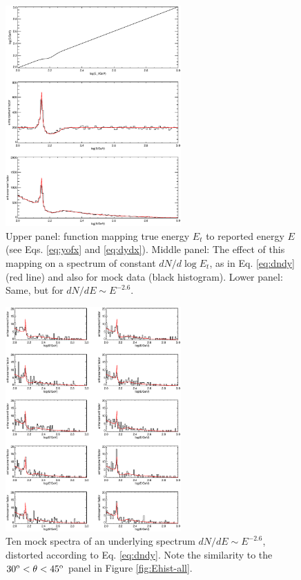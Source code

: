\documentclass[aps,twocolumn,prd,superscriptaddress,showpacs,nofootinbib,fixfloat]{revtex4}
\newcommand{\degree}{^{\rm o}}
\begin{document}
\begin{figure}[p]
\centering
\includegraphics[width=0.6\textwidth]{plots/limb_bump_model.ps}
\caption{Upper panel: function mapping true energy $E_t$ to reported energy
  $E$ (see Eqs. \ref{eq:yofx} and \ref{eq:dydx}).  Middle panel: The effect of
  this mapping on a spectrum of constant $dN/d\log E_t$, as in Eq.
  \ref{eq:dndy} (red line) and also for mock data (black histogram).  Lower
  panel: Same, but for $dN/dE \sim E^{-2.6}$.  }
\label{fig:bumpmodel}
\end{figure}

\begin{figure}[p]
\centering
\includegraphics[width=0.6\textwidth]{plots/limb_bump_model_many.ps}
\caption{Ten mock spectra of an underlying spectrum $dN/dE \sim E^{-2.6}$,
  distorted according to Eq. \ref{eq:dndy}.  Note the similarity to the
  $30\degree < \theta < 45\degree$ panel in Figure \ref{fig:Ehist-all}.  
}
\label{fig:bumpmodelmany}
\end{figure}
\end{document}
